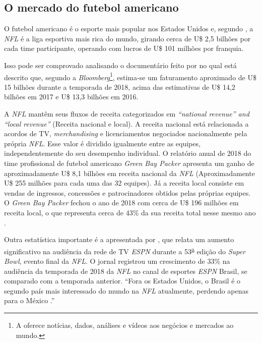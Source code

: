 \subsection{O mercado do futebol americano}
\label{mercado-do-futebol-americano}

O futebol americano é o esporte mais popular nos Estados Unidos e, segundo , a \textit{NFL} é a liga esportiva mais rica do mundo, girando cerca de U\$ 2,5 bilhões por cada time participante, operando com lucros de U\$ 101 milhões por franquia.

Isso pode ser comprovado analisando o documentário feito por  no qual está descrito que, segundo a \textit{Bloomberg}\footnote{A  oferece notícias, dados, análises e vídeos aos negócios e mercados ao mundo.\label{Bloomberg}}, estima-se um faturamento aproximado de U\$ 15 bilhões durante a temporada de 2018, acima das estimativas de U\$ 14,2 bilhões em 2017 e U\$ 13,3 bilhões em 2016.


A \textit{NFL} mantêm seus fluxos de receita categorizados em \textit{“national revenue” and “local revenue”} (Receita nacional e local). A receita nacional está relacionada a acordos de TV, \textit{merchandising} e licenciamentos negociados nacionalmente pela própria \textit{NFL}.  Esse valor é dividido igualmente entre as equipes, independentemente do seu desempenho individual. O relatório anual de 2018 do time profissional de futebol americano \textit{Green Bay Packer} apresenta um ganho de aproximadamente U\$ 8,1 bilhões em receita nacional da \textit{NFL} (Aproximadamente  U\$ 255 milhões para cada uma das 32 equipes). Já a receita local consiste em vendas de ingressos, concessões e patrocinadores obtidos pelas próprias equipes. O \textit{Green Bay Packer} fechou o ano de 2018 com cerca de U\$ 196 milhões em receita local, o que representa cerca de 43\% da sua receita total nesse mesmo ano \cite{INVESTOPEDIA2019}.

Outra estatística importante é a apresentada por , que relata um aumento significativo na audiência da rede de TV \textit{ESPN} durante a 53\textsuperscript{\underline{a}} edição do \textit{Super Bowl}, evento final da \textit{NFL}. O jornal  registrou um crescimento de 33\% na audiência da temporada de 2018 da \textit{NFL} no canal de esportes \textit{ESPN} Brasil, se comparado com a temporada anterior. “Fora os Estados Unidos, o Brasil é o segundo país mais interessado do mundo na \textit{NFL} atualmente, perdendo apenas para o México \cite{FOLHASP2019}.”
